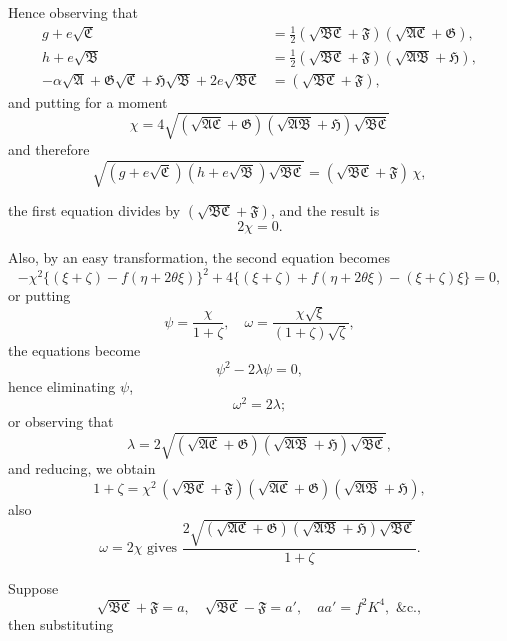 \documentclass[11pt,a4paper]{book}
\begin{document}
Hence observing that
\begin{align*}
g+e\sqrt{\mathfrak{C}} &= \tfrac{1}{2}(\sqrt{\mathfrak{B}\mathfrak{C}}+\mathfrak{F})(\sqrt{\mathfrak{A}\mathfrak{C}}+\mathfrak{G}),\\
h+e\sqrt{\mathfrak{B}} &= \tfrac{1}{2}(\sqrt{\mathfrak{B}\mathfrak{C}}+\mathfrak{F})(\sqrt{\mathfrak{A}\mathfrak{B}}+\mathfrak{H}),\\
-\alpha\sqrt{\mathfrak{A}}+\mathfrak{G}\sqrt{\mathfrak{C}}+\mathfrak{H}\sqrt{\mathfrak{B}}+2e\sqrt{\mathfrak{B}\mathfrak{C}} &= (\sqrt{\mathfrak{B}\mathfrak{C}}+\mathfrak{F}),
\end{align*}
and putting for a moment
\[
\chi = 4\sqrt{(\sqrt{\mathfrak{A}\mathfrak{C}}+\mathfrak{G})(\sqrt{\mathfrak{A}\mathfrak{B}}+\mathfrak{H})\sqrt{\mathfrak{B}\mathfrak{C}}}
\]
and therefore
\[
\sqrt{(g+e\sqrt{\mathfrak{C}})(h+e\sqrt{\mathfrak{B}})\sqrt{\mathfrak{B}\mathfrak{C}}} = (\sqrt{\mathfrak{B}\mathfrak{C}}+\mathfrak{F})\,\chi,
\]

\newpage
\setcounter{page}{74}

the first equation divides by $(\sqrt{\mathfrak{B}\mathfrak{C}}+\mathfrak{F})$, and the result is
\[
2\chi = 0.
\]

Also, by an easy transformation, the second equation becomes
\[
-\chi^2\{(\xi+\zeta)-f(\eta+2\theta\xi)\}^2 + 4\{(\xi+\zeta)+f(\eta+2\theta\xi)-(\xi+\zeta)\xi\} = 0,
\]
or putting
\[
\psi = \frac{\chi}{1+\zeta}, \quad \omega = \frac{\chi\sqrt{\xi}}{(1+\zeta)\sqrt{\zeta}},
\]
the equations become
\[
\psi^2 - 2\lambda\psi = 0,
\]
hence eliminating $\psi$,
\[
\omega^2 = 2\lambda;
\]
or observing that
\[
\lambda = 2\sqrt{(\sqrt{\mathfrak{A}\mathfrak{C}}+\mathfrak{G})(\sqrt{\mathfrak{A}\mathfrak{B}}+\mathfrak{H})\sqrt{\mathfrak{B}\mathfrak{C}}},
\]
and reducing, we obtain
\[
1+\zeta = \chi^2\,(\sqrt{\mathfrak{B}\mathfrak{C}}+\mathfrak{F})(\sqrt{\mathfrak{A}\mathfrak{C}}+\mathfrak{G})(\sqrt{\mathfrak{A}\mathfrak{B}}+\mathfrak{H}),
\]
also
\[
\omega = 2\chi \text{ gives } \frac{2\sqrt{(\sqrt{\mathfrak{A}\mathfrak{C}}+\mathfrak{G})(\sqrt{\mathfrak{A}\mathfrak{B}}+\mathfrak{H})\sqrt{\mathfrak{B}\mathfrak{C}}}}{1+\zeta}.
\]

Suppose
\[
\sqrt{\mathfrak{B}\mathfrak{C}}+\mathfrak{F} = a, \quad \sqrt{\mathfrak{B}\mathfrak{C}}-\mathfrak{F} = a', \quad aa' = f^2K^4, \text{ \&c.},
\]
then substituting

\newpage
\setcounter{page}{75}
\end{document}
